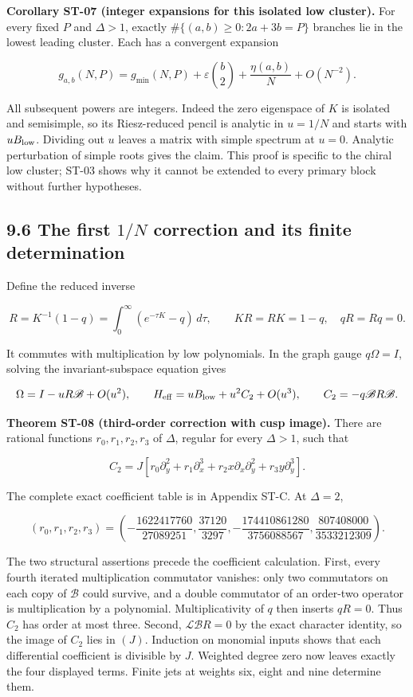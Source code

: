 \documentclass[a4paper,11pt]{article}
\numberwithin{equation}{section}
\begin{document}
\textbf{Corollary ST-07 (integer expansions for this isolated low cluster).} For every fixed \(P\) and \(\Delta>1\), exactly \(\#\{(a,b)\geq0:2a+3b=P\}\) branches lie in the lowest leading cluster. Each has a convergent expansion

\[
g_{a,b}(N,P)=g_{\min}(N,P)+
\varepsilon\binom b2+\frac{\eta(a,b)}N+O(N^{-2}).
\]

All subsequent powers are integers. Indeed the zero eigenspace of \(K\) is isolated and semisimple, so its Riesz-reduced pencil is analytic in \(u=1/N\) and starts with \(uB_{\rm low}\). Dividing out \(u\) leaves a matrix with simple spectrum at \(u=0\). Analytic perturbation of simple roots gives the claim. This proof is specific to the chiral low cluster; ST-03 shows why it cannot be extended to every primary block without further hypotheses.

\hypertarget{the-first-1n-correction-and-its-finite-determination}{%
\subsection{\texorpdfstring{9.6 The first \(1/N\) correction and its finite determination}{9.6 The first 1/N correction and its finite determination}}\label{the-first-1n-correction-and-its-finite-determination}}

Define the reduced inverse

\[
R=K^{-1}(1-q)=\int_0^\infty(e^{-\tau K}-q)\,d\tau,
\qquad KR=RK=1-q,\quad qR=Rq=0.
\]

It commutes with multiplication by low polynomials. In the graph gauge \(q\Omega=I\), solving the invariant-subspace equation gives

\[
\Omega=I-uR\mathscr B+O(u^2),\qquad
H_{\rm eff}=uB_{\rm low}+u^2C_2+O(u^3),
\qquad C_2=-q\mathscr BR\mathscr B.
\]

\textbf{Theorem ST-08 (third-order correction with cusp image).} There are rational functions \(r_0,r_1,r_2,r_3\) of \(\Delta\), regular for every \(\Delta>1\), such that

\[
C_2=
J\left[r_0\partial_y^2+r_1\partial_x^3+
r_2x\partial_x\partial_y^2+r_3y\partial_y^3\right].
\]

The complete exact coefficient table is in Appendix ST-C. At \(\Delta=2\),

\[
(r_0,r_1,r_2,r_3)=
\left(-\frac{1622417760}{27089251},
\frac{37120}{3297},
-\frac{174410861280}{3756088567},
\frac{807408000}{3533212309}\right).
\]

The two structural assertions precede the coefficient calculation. First, every fourth iterated multiplication commutator vanishes: only two commutators on each copy of \(\mathscr B\) could survive, and a double commutator of an order-two operator is multiplication by a polynomial. Multiplicativity of \(q\) then inserts \(qR=0\). Thus \(C_2\) has order at most three. Second, \(\mathcal L\mathscr BR=0\) by the exact character identity, so the image of \(C_2\) lies in \((J)\). Induction on monomial inputs shows that each differential coefficient is divisible by \(J\). Weighted degree zero now leaves exactly the four displayed terms. Finite jets at weights six, eight and nine determine them.
\end{document}
